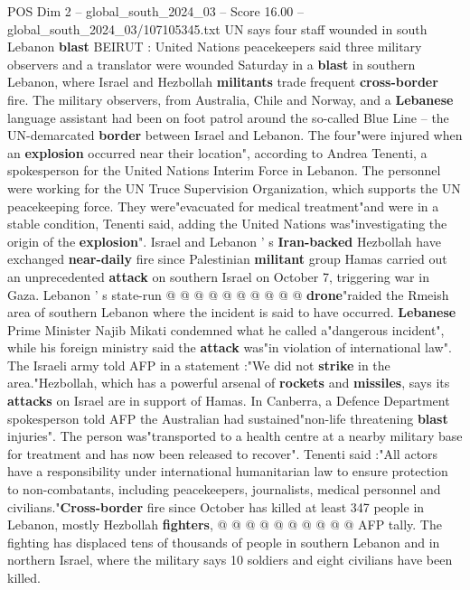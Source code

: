 \begin{textsample}{POS Dim 2 – global\_south\_2024\_03 – Score 16.00 – global\_south\_2024\_03/107105345.txt}  \label{ex:f2_pos_333}
UN says four staff wounded in south Lebanon \textbf{blast} BEIRUT : United Nations peacekeepers said three military observers and a translator were wounded Saturday in a \textbf{blast} in southern Lebanon, where Israel and Hezbollah \textbf{militants} trade frequent \textbf{cross-border} fire.
The military observers, from Australia, Chile and Norway, and a \textbf{Lebanese} language assistant had been on foot patrol around the so-called Blue Line -- the UN-demarcated \textbf{border} between Israel and Lebanon.
The four"were injured when an \textbf{explosion} occurred near their location", according to Andrea Tenenti, a spokesperson for the United Nations Interim Force in Lebanon.
The personnel were working for the UN Truce Supervision Organization, which supports the UN peacekeeping force.
They were"evacuated for medical treatment"and were in a stable condition, Tenenti said, adding the United Nations was"investigating the origin of the \textbf{explosion}".
Israel and Lebanon ' s \textbf{Iran-backed} Hezbollah have exchanged \textbf{near-daily} fire since Palestinian \textbf{militant} group Hamas carried out an unprecedented \textbf{attack} on southern Israel on October 7, triggering war in Gaza.
Lebanon ' s state-run @ @ @ @ @ @ @ @ @ @ \textbf{drone}"raided the Rmeish area of southern Lebanon where the incident is said to have occurred. \textbf{Lebanese} Prime Minister Najib Mikati condemned what he called a"dangerous incident", while his foreign ministry said the \textbf{attack} was"in violation of international law".
The Israeli army told AFP in a statement :"We did not \textbf{strike} in the area."Hezbollah, which has a powerful arsenal of \textbf{rockets} and \textbf{missiles}, says its \textbf{attacks} on Israel are in support of Hamas.
In Canberra, a Defence Department spokesperson told AFP the Australian had sustained"non-life threatening \textbf{blast} injuries".
The person was"transported to a health centre at a nearby military base for treatment and has now been released to recover".
Tenenti said :"All actors have a responsibility under international humanitarian law to ensure protection to non-combatants, including peacekeepers, journalists, medical personnel and civilians."\textbf{Cross-border} fire since October has killed at least 347 people in Lebanon, mostly Hezbollah \textbf{fighters}, @ @ @ @ @ @ @ @ @ @ AFP tally.
The fighting has displaced tens of thousands of people in southern Lebanon and in northern Israel, where the military says 10 soldiers and eight civilians have been killed.

\end{textsample}

